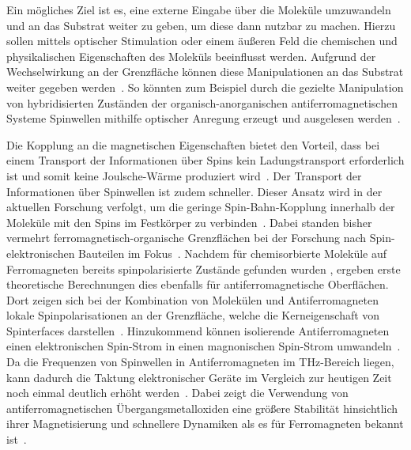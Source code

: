     Ein mögliches Ziel ist es, eine externe Eingabe über die Moleküle umzuwandeln und an das Substrat weiter zu geben, um diese dann nutzbar zu machen.
    Hierzu sollen mittels optischer Stimulation oder einem äußeren Feld die chemischen und physikalischen Eigenschaften des Moleküls beeinflusst werden.
    Aufgrund der Wechselwirkung an der Grenzfläche können diese Manipulationen an das Substrat weiter gegeben werden~\cite{IF_16}.
    So könnten zum Beispiel durch die gezielte Manipulation von hybridisierten Zuständen der organisch-anorganischen antiferromagnetischen Systeme Spinwellen mithilfe optischer Anregung erzeugt und ausgelesen werden~\cite{AFM_2,AFM_1}.

    Die Kopplung an die magnetischen Eigenschaften bietet den Vorteil, dass bei einem Transport der Informationen über Spins kein Ladungstransport erforderlich ist und somit keine Joulsche-Wärme produziert wird~\cite{AFM_3}.
    Der Transport der Informationen über Spinwellen ist zudem schneller.
    Dieser Ansatz wird in der aktuellen Forschung verfolgt, um die geringe Spin-Bahn-Kopplung innerhalb der Moleküle mit den Spins im Festkörper zu verbinden~\cite{xiong_giant_2004}.
    Dabei standen bisher vermehrt ferromagnetisch-organische Grenzflächen bei der Forschung nach Spin-elektronischen Bauteilen im Fokus~\cite{ma-DJ, AFM_5}.
    Nachdem für chemisorbierte Moleküle auf Ferromagneten bereits spinpolarisierte Zustände gefunden wurden \cite{IF_16}, ergeben erste theoretische Berechnungen dies ebenfalls für antiferromagnetische Oberflächen.
    Dort zeigen sich bei der Kombination von Molekülen und Antiferromagneten lokale Spinpolarisationen an der Grenzfläche, welche die Kerneigenschaft von Spinterfaces darstellen~\cite{AFM_2}.
    Hinzukommend können isolierende Antiferromagneten einen elektronischen Spin-Strom in einen magnonischen Spin-Strom umwandeln~\cite{AFM_1}.
    Da die Frequenzen von Spinwellen in Antiferromagneten im \si{\tera\hertz}-Bereich liegen, kann dadurch die Taktung elektronischer Geräte im Vergleich zur heutigen Zeit noch einmal deutlich erhöht werden~\cite{AFM_5}.
    Dabei zeigt die Verwendung von antiferromagnetischen Übergangsmetalloxiden eine größere Stabilität hinsichtlich ihrer Magnetisierung und schnellere Dynamiken als es für Ferromagneten bekannt ist~\cite{AFM_1}.
    

